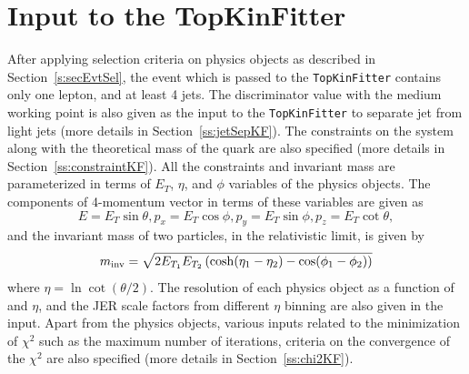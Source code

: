 \section{Input to the TopKinFitter}
\label{ss:inputKF} 
After applying selection criteria on physics objects as described
in Section~\ref{s:secEvtSel}, the event which is passed to the \verb|TopKinFitter| contains 
only one lepton, \MET and at least 4 jets. The \PQb discriminator value with the medium 
working point is also given as the input to the \verb|TopKinFitter| to separate \PQb jet 
from light jets (more details in Section~\ref{ss:jetSepKF}). The constraints on the \ttbar 
system along with the theoretical mass of the \PQt quark are also specified
(more details in Section~\ref{ss:constraintKF}). All the constraints and invariant mass are 
parameterized in terms of $E_{T}$, $\eta$, and $\phi$ variables of the physics objects. 
The components of 4-momentum vector in terms of these variables are given as
\begin{equation}
E = E_{T} \sin\theta, p_x = E_{T}\cos\phi, p_y = E_{T}\sin\phi, p_z = E_{T}\cot\theta,
\end{equation}
and the invariant mass of two particles, in the relativistic limit, is given by
\begin{equation}
	m_{\rm{inv}} = \sqrt{2 E_{T_1}E_{T_2}\left(\cosh(\eta_1 - \eta_2) - \cos(\phi_1 - \phi_2)\right)}
\end{equation}
where $\eta = \ln\cot(\theta/2)$. The resolution of each physics object as a function of 
\pt and $\eta$, and the JER scale factors from different $\eta$ binning are also given in the 
input. Apart from the physics objects, various inputs related to the minimization of 
$\chi^2$ such as the maximum number of iterations, criteria on the convergence of the $\chi^2$
are also specified (more details in Section~\ref{ss:chi2KF}).


